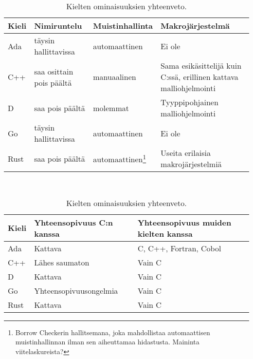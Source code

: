 \begin{table}[ht!]
    \begin{adjustbox}{center}
        \kern-0.7cm
        \begin{tabular}{@{}lllp{6.2cm}@{}} \toprule
        Kieli & Nimiruntelu              & Muistinhallinta & Makrojärjestelmä \\ \midrule
        Ada   & täysin hallittavissa     & automaattinen   & Ei ole \\
        C++   & saa osittain pois päältä & manuaalinen     & Sama esikäsittelijä kuin C:ssä, \mbox{erillinen} kattava malliohjelmointi \\
        D     & saa pois päältä          & molemmat        & Tyyppipohjainen malliohjelmointi \\
        Go    & täysin hallittavissa     & automaattinen   & Ei ole \\
            Rust  & saa pois päältä & automaattinen\footnote{Borrow Checkerin hallitsemana, joka mahdollistaa automaattisen muistinhallinnan ilman sen aiheuttamaa hidastusta. Maininta viitelaskureista?} & Useita erilaisia makrojärjestelmiä \\ \bottomrule
    \end{tabular}
    \end{adjustbox} \\[0.5cm]

    \begin{adjustbox}{center}
        \begin{tabular}{@{}lll@{}} \toprule
            Kieli & Yhteensopivuus C:n kanssa                                                   & Yhteensopivuus muiden kielten kanssa \\ \midrule
            Ada   & Kattava         & C, C++, Fortran, Cobol \\
            C++   & Lähes saumaton                                                              & Vain C \\
            D     & Kattava         & Vain C \\
            Go    & Yhteensopivuusongelmia   & Vain C \\
            Rust  & Kattava         & Vain C \\ \bottomrule
        \end{tabular}
    \end{adjustbox}
    \caption{
        Kielten ominaisuuksien yhteenveto.
    }
    \label{table:properties}
\end{table}

